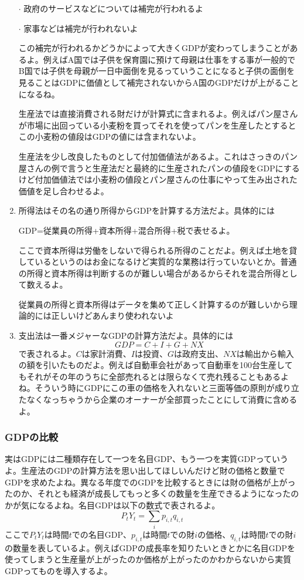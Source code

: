 \documentclass[dvipdfmx,a4paper, 12pt]{article}
\begin{document}
\begin{Introduction}
\begin{enumerate}
\quad $\cdot$ 政府のサービスなどについては補完が行われるよ

\quad $\cdot$ 家事などは補完が行われないよ

この補完が行われるかどうかによって大きくGDPが変わってしまうことがあるよ。例えばA国では子供を保育園に預けて母親は仕事をする事が一般的でB国では子供を母親が一日中面倒を見るっていうことになると子供の面倒を見ることはGDPに価値として補完されないからA国のGDPだけが上がることになるね。

生産法では直接消費される財だけが計算式に含まれるよ。例えばパン屋さんが市場に出回っている小麦粉を買ってそれを使ってパンを生産したとするとこの小麦粉の値段はGDPの値には含まれないよ。

生産法を少し改良したものとして付加価値法があるよ。これはさっきのパン屋さんの例で言うと生産法だと最終的に生産されたパンの値段をGDPにするけど付加価値法では小麦粉の値段とパン屋さんの仕事にやって生み出された価値を足し合わせるよ。

  \item 所得法はその名の通り所得からGDPを計算する方法だよ。具体的には

GDP=従業員の所得+資本所得+混合所得+税で表せるよ。

ここで資本所得は労働をしないで得られる所得のことだよ。例えば土地を貸しているというのはお金になるけど実質的な業務は行っていないとか。普通の所得と資本所得は判断するのが難しい場合があるからそれを混合所得として数えるよ。

従業員の所得と資本所得はデータを集めて正しく計算するのが難しいから理論的には正しいけどあんまり使われないよ

  \item
支出法は一番メジャーなGDPの計算方法だよ。具体的には
\begin{equation*}
  GDP=C+I+G+NX
\end{equation*}
で表されるよ。$C$は家計消費、$I$は投資、$G$は政府支出、$NX$は輸出から輸入の額を引いたものだよ。例えば自動車会社があって自動車を100台生産してもそれがその年のうちに全部売れるとは限らなくて売れ残ることもあるよね。そういう時にGDPにこの車の価格を入れないと三面等価の原則が成り立たなくなっちゃうから企業のオーナーが全部買ったことにして消費に含めるよ。
\end{enumerate}
\subsubsection{GDPの比較}
実はGDPには二種類存在して一つを名目GDP、もう一つを実質GDPっていうよ。生産法のGDPの計算方法を思い出してほしいんだけど財の価格と数量でGDPを求めたよね。異なる年度でのGDPを比較するときには財の価格が上がったのか、それとも経済が成長してもっと多くの数量を生産できるようになったのかが気になるよね。名目GDPは以下の数式で表されるよ。
\begin{equation*}
  P_tY_t=\sum_i p_{i,t}q_{i,t}
\end{equation*}
ここで$P_tY_t$は時間$t$での名目GDP、$p_{i,t}$は時間$t$での財$i$の価格、$q_{i,t}$は時間$t$での財$i$の数量を表しているよ。例えばGDPの成長率を知りたいときとかに名目GDPを使ってしまうと生産量が上がったのか価格が上がったのかわからないから実質GDPってものを導入するよ。


\end{Introduction}
\end{document}
